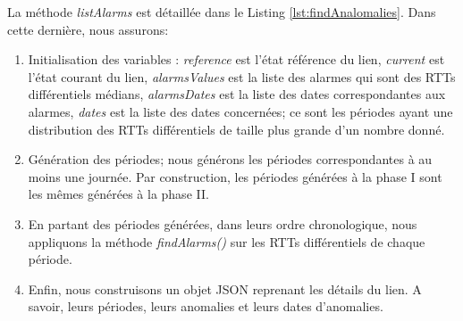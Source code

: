 La méthode \textit{listAlarms} est détaillée dans le Listing \ref{lst:findAnalomalies}. Dans cette dernière, nous assurons:


\begin{enumerate}
	\item Initialisation des variables : \textit{reference} est l'état référence du lien, \textit{current} est l'état courant du lien, \textit{alarmsValues} est la liste des alarmes qui sont des RTTs différentiels médians, \textit{alarmsDates} est la liste des dates correspondantes aux alarmes, \textit{dates} est la liste des dates concernées; ce sont les périodes ayant une distribution des RTTs différentiels de taille plus grande d'un nombre donné.
	\item  Génération des périodes; nous générons les périodes correspondantes à au moins une journée. Par construction, les périodes générées à la phase I sont les mêmes générées à la phase II.
    \item  En partant des périodes générées, dans leurs ordre chronologique, nous appliquons la méthode \textit{findAlarms()} sur les RTTs différentiels de chaque période. 
    \item Enfin, nous construisons un objet JSON reprenant les détails du lien. A savoir, leurs périodes, leurs anomalies et leurs dates d'anomalies. 
\end{enumerate}

